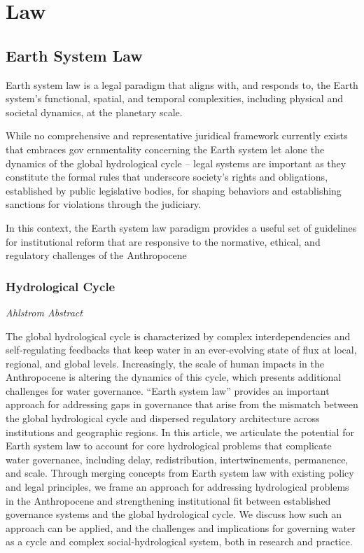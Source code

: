 \documentclass[
]{book}
\begin{document}
\hypertarget{law}{%
\chapter{Law}\label{law}}

\hypertarget{earth-system-law}{%
\section{Earth System Law}\label{earth-system-law}}

Earth system law is a legal paradigm that
aligns with, and responds to, the Earth system's functional, spatial, and
temporal complexities, including physical and societal dynamics, at the
planetary scale.

While no comprehensive and
representative juridical framework currently exists that embraces gov­
ernmentality concerning the Earth system let
alone the dynamics of the global hydrological cycle -- legal systems are
important as they constitute the formal rules that underscore society's
rights and obligations, established by public legislative bodies, for
shaping behaviors and establishing sanctions for violations through the
judiciary.

In this context, the Earth system
law paradigm provides a useful set of guidelines for institutional reform
that are responsive to the normative, ethical, and regulatory challenges
of the Anthropocene

\hypertarget{hydrological-cycle}{%
\subsection{Hydrological Cycle}\label{hydrological-cycle}}

\emph{Ahlstrom Abstract}

The global hydrological cycle is characterized by complex interdependencies and self-regulating feedbacks that keep water in an ever-evolving state of flux at local, regional, and global levels. Increasingly, the scale of human impacts in the Anthropocene is altering the dynamics of this cycle, which presents additional challenges for water governance. ``Earth system law'' provides an important approach for addressing gaps in governance that arise from the mismatch between the global hydrological cycle and dispersed regulatory architecture across institutions and geographic regions. In this article, we articulate the potential for Earth system law to account for core hydrological problems that complicate water governance, including delay, redistribution, intertwinements, permanence, and scale. Through merging concepts from Earth system law with existing policy and legal principles, we frame an approach for addressing hydrological problems in the Anthropocene and strengthening institutional fit between established governance systems and the global hydrological cycle. We discuss how such an approach can be applied, and the challenges and implications for governing water as a cycle and complex social-hydrological system, both in research and practice.
\end{document}
